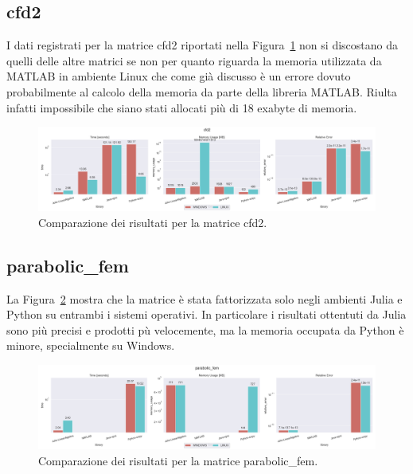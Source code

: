 \documentclass{report}
\begin{document}
            \subsection{cfd2}
                I dati registrati per la matrice cfd2 riportati nella 
                Figura~\ref{fig:cfd2} non si discostano da quelli delle altre
                matrici se non per quanto riguarda la memoria utilizzata da
                MATLAB in ambiente Linux che come già discusso è un errore
                dovuto probabilmente al calcolo della memoria da parte della 
                libreria MATLAB. Riulta infatti impossibile che siano stati 
                allocati più di 18 exabyte di memoria.
                \begin{figure}[h]
                    \includegraphics[width=\textwidth]{cfd2}
                    \caption{Comparazione dei risultati per la matrice cfd2.}
                    \label{fig:cfd2}
                \end{figure}
            \subsection{parabolic\_fem}
                La Figura~\ref{fig:parabolic_fem} mostra che la matrice è stata
                fattorizzata solo negli ambienti Julia e Python su entrambi i 
                sistemi operativi. In particolare i risultati ottentuti da Julia
                sono più precisi e prodotti pù velocemente, ma la memoria 
                occupata da Python è minore, specialmente su Windows.
                \begin{figure}[h]
                    \includegraphics[width=\textwidth]{parabolic_fem}
                    \caption{Comparazione dei risultati per la matrice parabolic\_fem.}
                    \label{fig:parabolic_fem}
                \end{figure}
\end{document}
